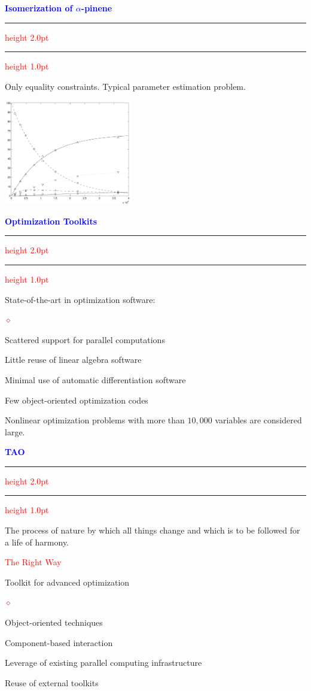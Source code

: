\documentclass{seminar}
\newcommand{\reddiamond}{\textcolor{red}{$\diamond$}}
\newcommand{\redstripe}{\textcolor{red}{\hrule height 2.0pt\hfil}
             \vspace{-1.8pt}
             \textcolor{red}{\hrule height 1.0pt\hfil}
}
\newcommand{\heading}[1]{%
   \centerline{\textcolor{blue}{\textbf{#1}}}%
    \redstripe%
    \bigskip
}
\begin{document}
\begin{slide}

\heading{Isomerization of $\alpha$-pinene}

Only equality constraints. Typical parameter estimation problem. 

\bigskip

\centerline {\includegraphics[height=1.8in]{../images/pinene}}

\vfill

\end{slide}

\begin{slide}

\heading{Optimization Toolkits}

State-of-the-art in optimization software:

\begin{list}{\reddiamond}{}
\item
Scattered support for parallel computations
\item
Little reuse of linear algebra software
\item
Minimal use of automatic differentiation software
\item
Few object-oriented optimization codes
\item
Nonlinear optimization problems with more than $ 10, 000 $
variables are considered large.
\end{list}

\vfill

\end{slide}

\begin{slide}

\heading{TAO}

The process of nature by which all things change
and which is to be followed for a life of harmony.

\bigskip

\begin{center}
\textcolor{red}{The Right Way}
\end{center}

\bigskip

Toolkit for advanced optimization

\begin{list}{\reddiamond}{}
\item
Object-oriented techniques
\item
Component-based interaction
\item
Leverage of existing parallel computing infrastructure
\item
Reuse of external toolkits
\end{list}

\vfill

\end{slide}
\end{document}
